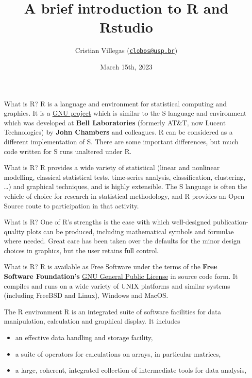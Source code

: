 \documentclass[
  ignorenonframetext,
]{beamer}
\title{A brief introduction to R and Rstudio}
\author{Cristian Villegas
(\href{mailto:clobos@usp.br}{\nolinkurl{clobos@usp.br}})}
\date{March 15th, 2023}
\institute{Universidade de São Paulo}
\providecommand{\tightlist}{%
  \setlength{\itemsep}{0pt}\setlength{\parskip}{0pt}}
\begin{document}
\frame{\titlepage}

\begin{frame}{What is R?}
\protect\hypertarget{what-is-r}{}
R is a language and environment for statistical computing and graphics.
It is a \href{https://www.gnu.org/}{GNU project} which is similar to the
S language and environment which was developed at \textbf{Bell
Laboratories} (formerly AT\&T, now Lucent Technologies) by \textbf{John
Chambers} and colleagues. R can be considered as a different
implementation of S. There are some important differences, but much code
written for S runs unaltered under R.
\end{frame}

\begin{frame}{What is R?}
\protect\hypertarget{what-is-r-1}{}
R provides a wide variety of statistical (linear and nonlinear
modelling, classical statistical tests, time-series analysis,
classification, clustering, \ldots) and graphical techniques, and is
highly extensible. The S language is often the vehicle of choice for
research in statistical methodology, and R provides an Open Source route
to participation in that activity.
\end{frame}

\begin{frame}{What is R?}
\protect\hypertarget{what-is-r-2}{}
One of R's strengths is the ease with which well-designed
publication-quality plots can be produced, including mathematical
symbols and formulae where needed. Great care has been taken over the
defaults for the minor design choices in graphics, but the user retains
full control.
\end{frame}

\begin{frame}{What is R?}
\protect\hypertarget{what-is-r-3}{}
R is available as Free Software under the terms of the \textbf{Free
Software Foundation's} \href{https://www.r-project.org/COPYING}{GNU
General Public License} in source code form. It compiles and runs on a
wide variety of UNIX platforms and similar systems (including FreeBSD
and Linux), Windows and MacOS.
\end{frame}

\begin{frame}{The R environment}
\protect\hypertarget{the-r-environment}{}
R is an integrated suite of software facilities for data manipulation,
calculation and graphical display. It includes

\begin{itemize}[<+->]
\tightlist
\item
  an effective data handling and storage facility,
\item
  a suite of operators for calculations on arrays, in particular
  matrices,
\item
  a large, coherent, integrated collection of intermediate tools for
  data analysis,
\end{itemize}
\end{frame}
\end{document}
